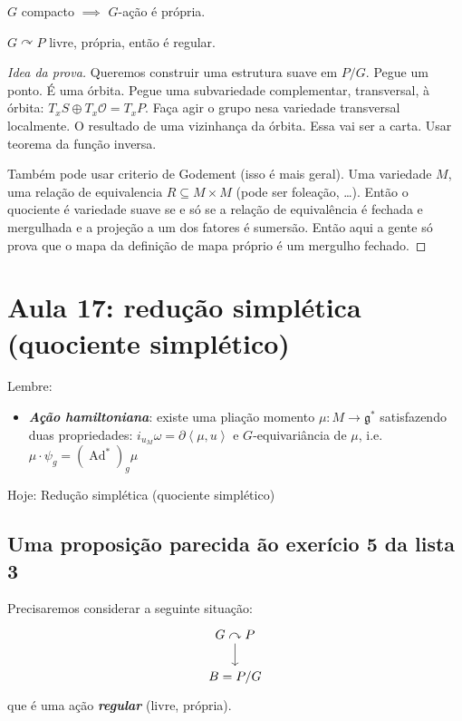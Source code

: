 \begin{example}\leavevmode
	$G$ compacto $\implies $ $G$-ação é própria.
\end{example}

\begin{thm}[Palais]\leavevmode
	$G \curvearrowright P$ livre, própria, então é regular.
\end{thm}

\begin{proof}[Idea da prova]\leavevmode
	Queremos construir uma estrutura suave em $P/G$. Pegue um ponto.  É uma órbita. Pegue uma subvariedade complementar, transversal, à órbita: $T_{x}S\oplus T_{x}\mathcal{O}=T_{x}P$. Faça agir o grupo nesa variedade transversal localmente. O resultado de uma vizinhança da órbita. Essa vai ser a carta. Usar teorema da função inversa.

	Também pode usar criterio de Godement (isso é mais geral). Uma variedade $M$, uma relação de equivalencia $R \subseteq M\times M$ (pode ser foleação, …). Então o quociente é variedade suave se e só se a relação de equivalência é fechada e mergulhada e a projeção a um dos fatores é sumersão. Então aqui a gente só prova que o mapa da definição de mapa próprio é um mergulho  fechado.
\end{proof}




\section{Aula 17: redução simplética (quociente simplético)}

Lembre:
\begin{itemize}
\item \textit{\textbf{Ação hamiltoniana}}: existe uma pliação momento $\mu:M\longrightarrow \mathfrak{g}^*$ satisfazendo duas propriedades: $i_{u_M}\omega=\partial \left<\mu,u\right> $ e $G$-equivariância de $\mu$, i.e. $\mu\cdot \psi_g=(\operatorname{Ad}^*)_g\mu$
\end{itemize}

Hoje: Redução simplética (quociente simplético)

\subsection{Uma proposição parecida ão exerício 5 da lista 3}

Precisaremos considerar a seguinte situação:
\[\begin{tikzcd}
G\curvearrowright P\arrow[d]\\
B=P/G
\end{tikzcd}\]
que é uma ação \textit{\textbf{regular}} (livre, própria).

